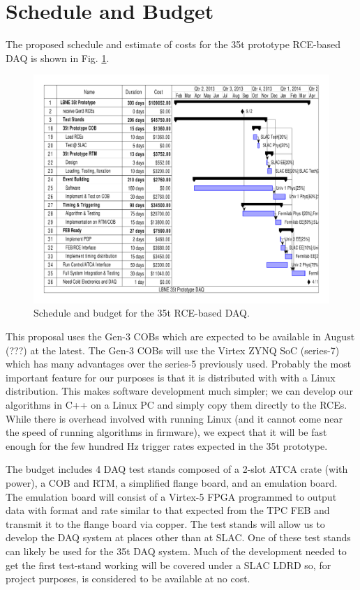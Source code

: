 \section{Schedule and Budget}

The proposed schedule and estimate of costs for the 35t prototype RCE-based DAQ is shown in Fig. \ref{fig:budget35t}.  

\begin{figure}[htb]
\includegraphics[scale=0.8,angle=90]{project-gantt.pdf}
\caption{Schedule and budget for the 35t RCE-based DAQ.}
\label{fig:budget35t}
\end{figure} 

This proposal uses the Gen-3 COBs which are expected to be available in August  (???) at the latest.  The Gen-3 COBs will use the Virtex ZYNQ SoC (series-7) which has many advantages over the series-5 previously used.  Probably the most important feature for our purposes is that it is distributed with with a Linux distribution.  This makes software development much simpler; we can develop our algorithms in C++ on a Linux PC and simply copy them directly to the RCEs.  While there is overhead involved with running Linux (and it cannot come near the speed of running algorithms in firmware), we expect that it will be fast enough for the few hundred Hz trigger rates expected in the 35t prototype.  

The budget includes 4 DAQ test stands composed of a 2-slot ATCA crate (with power), a COB and RTM, a simplified flange board, and an emulation board.  The emulation board will consist of a Virtex-5 FPGA programmed to output data with format and rate  similar to that expected from the TPC FEB and transmit it to the flange board via copper.  The test stands will allow us to develop the DAQ system at places other than at SLAC.  One of these test stands can likely be used for the 35t DAQ system.    Much of the development needed to get the first test-stand working will be covered under a SLAC LDRD so, for project purposes, is considered to be available at no cost.  

